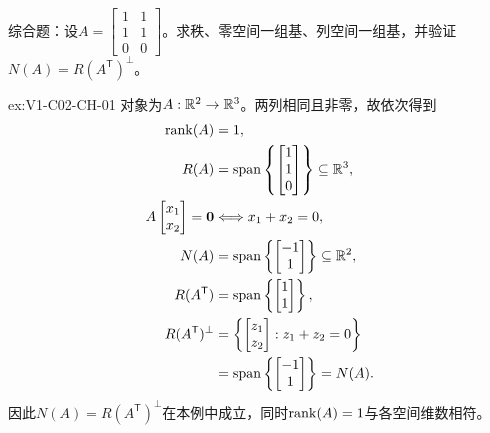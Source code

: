 \begin{SLChapterExercisePairSection}
\begin{exercise}[章末综合]\label{ex:V1-C02-CH-01}
综合题：设$A=\begin{bmatrix}1&1\\1&1\\0&0\end{bmatrix}$。求秩、零空间一组基、列空间一组基，并验证$N(A)=R(A^{\mathsf T})^{\perp}$。
\end{exercise}
\label{sol:V1-C02-CH-01}
\begin{chapterexercisesolution}{ex:V1-C02-CH-01}
对象为$A:\mathbb{R}^2\to\mathbb{R}^3$。两列相同且非零，故依次得到
\[
\begin{aligned}
\operatorname{rank}(A)&=1,\\
R(A)&=\operatorname{span}\left\{\begin{bmatrix}1\\1\\0\end{bmatrix}\right\}\subseteq\mathbb{R}^3,\\
A\begin{bmatrix}x_1\\x_2\end{bmatrix}=\boldsymbol0
&\Longleftrightarrow x_1+x_2=0,\\
N(A)&=\operatorname{span}\left\{\begin{bmatrix}-1\\1\end{bmatrix}\right\}\subseteq\mathbb{R}^2,\\
R(A^{\mathsf T})
&=\operatorname{span}\left\{\begin{bmatrix}1\\1\end{bmatrix}\right\},\\
R(A^{\mathsf T})^\perp
&=\left\{\begin{bmatrix}z_1\\z_2\end{bmatrix}:z_1+z_2=0\right\}\\
&=\operatorname{span}\left\{\begin{bmatrix}-1\\1\end{bmatrix}\right\}=N(A).
\end{aligned}
\]
因此$N(A)=R(A^{\mathsf T})^\perp$在本例中成立，同时$\operatorname{rank}(A)=1$与各空间维数相符。
\end{chapterexercisesolution}

\end{SLChapterExercisePairSection}

